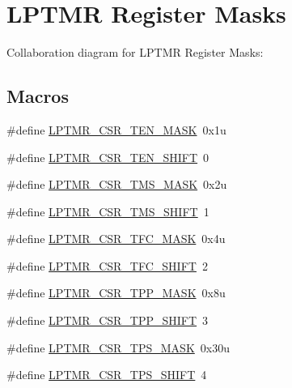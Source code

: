\hypertarget{group___l_p_t_m_r___register___masks}{}\section{L\+P\+T\+MR Register Masks}
\label{group___l_p_t_m_r___register___masks}
Collaboration diagram for L\+P\+T\+MR Register Masks\+:
\subsection*{Macros}
\begin{DoxyCompactItemize}
\item 
\#define \hyperlink{group___l_p_t_m_r___register___masks_ga4ed197f1cb8d0e954324b4854ff14a83}{L\+P\+T\+M\+R\+\_\+\+C\+S\+R\+\_\+\+T\+E\+N\+\_\+\+M\+A\+SK}~0x1u
\item 
\#define \hyperlink{group___l_p_t_m_r___register___masks_gada00f24f79b11a91e8404b4531d66733}{L\+P\+T\+M\+R\+\_\+\+C\+S\+R\+\_\+\+T\+E\+N\+\_\+\+S\+H\+I\+FT}~0
\item 
\#define \hyperlink{group___l_p_t_m_r___register___masks_ga57ee593a57d844d7bb4b87c127765558}{L\+P\+T\+M\+R\+\_\+\+C\+S\+R\+\_\+\+T\+M\+S\+\_\+\+M\+A\+SK}~0x2u
\item 
\#define \hyperlink{group___l_p_t_m_r___register___masks_gaeac406c6a48e15c6ec5784fb891b51b6}{L\+P\+T\+M\+R\+\_\+\+C\+S\+R\+\_\+\+T\+M\+S\+\_\+\+S\+H\+I\+FT}~1
\item 
\#define \hyperlink{group___l_p_t_m_r___register___masks_gaca581598c0f319b0002deda730479842}{L\+P\+T\+M\+R\+\_\+\+C\+S\+R\+\_\+\+T\+F\+C\+\_\+\+M\+A\+SK}~0x4u
\item 
\#define \hyperlink{group___l_p_t_m_r___register___masks_gaee3d1b59f30f6217f1f74b18cf973c4a}{L\+P\+T\+M\+R\+\_\+\+C\+S\+R\+\_\+\+T\+F\+C\+\_\+\+S\+H\+I\+FT}~2
\item 
\#define \hyperlink{group___l_p_t_m_r___register___masks_ga020eee1550f2943c10d51f8b56930e62}{L\+P\+T\+M\+R\+\_\+\+C\+S\+R\+\_\+\+T\+P\+P\+\_\+\+M\+A\+SK}~0x8u
\item 
\#define \hyperlink{group___l_p_t_m_r___register___masks_ga62be70d70bd4e88e26e5cc8437f6fd55}{L\+P\+T\+M\+R\+\_\+\+C\+S\+R\+\_\+\+T\+P\+P\+\_\+\+S\+H\+I\+FT}~3
\item 
\#define \hyperlink{group___l_p_t_m_r___register___masks_ga3502ccff1cbdb70bb99b73c035ab1e19}{L\+P\+T\+M\+R\+\_\+\+C\+S\+R\+\_\+\+T\+P\+S\+\_\+\+M\+A\+SK}~0x30u
\item 
\#define \hyperlink{group___l_p_t_m_r___register___masks_ga7759d842742bfedd91788d41ef12fb8d}{L\+P\+T\+M\+R\+\_\+\+C\+S\+R\+\_\+\+T\+P\+S\+\_\+\+S\+H\+I\+FT}~4

\end{DoxyCompactItemize}
